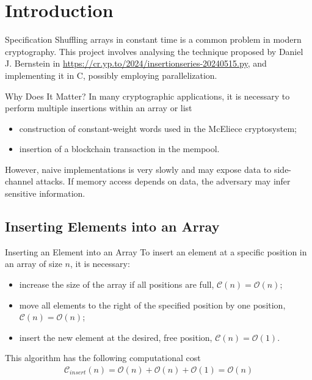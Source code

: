 \section{Introduction}
    \begin{frame}{Specification}
        Shuffling arrays in constant time is a common problem in modern cryptography. This project involves analysing the technique proposed by Daniel J. Bernstein in \url{https://cr.yp.to/2024/insertionseries-20240515.py}, and implementing it in C, possibly employing parallelization.
    \end{frame}

    \begin{frame}{Why Does It Matter?}
        In many cryptographic applications, it is necessary to perform multiple insertions within an array or list
        \begin{itemize}
            \item construction of constant-weight words used in the McEliece cryptosystem;
            \item insertion of a blockchain transaction in the mempool.
        \end{itemize}

        However, naive implementations is very slowly and may expose data to side-channel attacks. If memory access depends on data, the adversary may infer sensitive information.
    \end{frame}

    \subsection{Inserting Elements into an Array}
        \begin{frame}{Inserting an Element into an Array}
            To insert an element at a specific position in an array of size $n$, it is necessary:
            \begin{itemize}
                \item increase the size of the array if all positions are full, $\mathcal{C}{\left(n\right)} = \mathcal{O}{\left(n\right)}$;
                \item move all elements to the right of the specified position by one position, $\mathcal{C}{\left(n\right)} = \mathcal{O}{\left(n\right)}$;
                \item insert the new element at the desired, free position, $\mathcal{C}{\left(n\right)} = \mathcal{O}{\left(1\right)}$.
            \end{itemize}
    
            \leavevmode
    
            This algorithm has the following computational cost
            \begin{align*}
                \mathcal{C}_{insert}{\left(n\right)} = \mathcal{O}{\left(n\right)} + \mathcal{O}{\left(n\right)} + \mathcal{O}{\left(1\right)} = \mathcal{O}{\left(n\right)}
            \end{align*}
        \end{frame}
    
